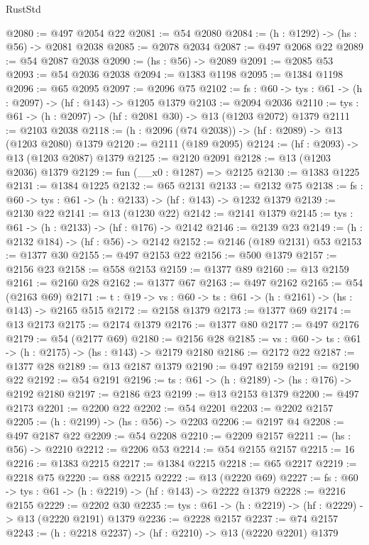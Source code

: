 \begin{lexlean}{RustStd}
\begin{coremodule}
{\begin{coremodule}
{{{{{{{{{{{{@2080 := @497 @2054 @22
@2081 := @54 @2080
@2084 := (h : @1292) -> (hs : @56) -> @2081 @2038
@2085 := @2078 @2034
@2087 := @497 @2068 @22
@2089 := @54 @2087 @2038
@2090 := (hs : @56) -> @2089
@2091 := @2085 @53
@2093 := @54 @2036 @2038
@2094 := @1383 @1198
@2095 := @1384 @1198
@2096 := @65 @2095
@2097 := @2096 @75
@2102 := {fs : @60} -> {tys : @61} -> (h : @2097) -> (hf : @143) -> @1205 @1379
@2103 := @2094 @2036
@2110 := {tys : @61} -> (h : @2097) -> (hf : @2081 @30) -> @13 (@1203 @2072) @1379
@2111 := @2103 @2038
@2118 := (h : @2096 (@74 @2038)) -> (hf : @2089) -> @13 (@1203 @2080) @1379
@2120 := @2111 (@189 @2095)
@2124 := (hf : @2093) -> @13 (@1203 @2087) @1379
@2125 := @2120 @2091
@2128 := @13 (@1203 @2036) @1379
@2129 := fun (__x0 : @1287) => @2125
@2130 := @1383 @1225
@2131 := @1384 @1225
@2132 := @65 @2131
@2133 := @2132 @75
@2138 := {fs : @60} -> {tys : @61} -> (h : @2133) -> (hf : @143) -> @1232 @1379
@2139 := @2130 @22
@2141 := @13 (@1230 @22)
@2142 := @2141 @1379
@2145 := {tys : @61} -> (h : @2133) -> (hf : @176) -> @2142
@2146 := @2139 @23
@2149 := (h : @2132 @184) -> (hf : @56) -> @2142
@2152 := @2146 (@189 @2131) @53
@2153 := @1377 @30
@2155 := @497 @2153 @22
@2156 := @500 @1379
@2157 := @2156 @23
@2158 := @558 @2153
@2159 := @1377 @89
@2160 := @13 @2159
@2161 := @2160 @28
@2162 := @1377 @67
@2163 := @497 @2162
@2165 := @54 (@2163 @69)
@2171 := {t : @19} -> {vs : @60} -> {ts : @61} -> (h : @2161) -> (hs : @143) -> @2165 @515
@2172 := @2158 @1379
@2173 := @1377 @69
@2174 := @13 @2173
@2175 := @2174 @1379
@2176 := @1377 @80
@2177 := @497 @2176
@2179 := @54 (@2177 @69)
@2180 := @2156 @28
@2185 := {vs : @60} -> {ts : @61} -> (h : @2175) -> (hs : @143) -> @2179 @2180
@2186 := @2172 @22
@2187 := @1377 @28
@2189 := @13 @2187 @1379
@2190 := @497 @2159
@2191 := @2190 @22
@2192 := @54 @2191
@2196 := {ts : @61} -> (h : @2189) -> (hs : @176) -> @2192 @2180
@2197 := @2186 @23
@2199 := @13 @2153 @1379
@2200 := @497 @2173
@2201 := @2200 @22
@2202 := @54 @2201
@2203 := @2202 @2157
@2205 := (h : @2199) -> (hs : @56) -> @2203
@2206 := @2197 @4
@2208 := @497 @2187 @22
@2209 := @54 @2208
@2210 := @2209 @2157
@2211 := (hs : @56) -> @2210
@2212 := @2206 @53
@2214 := @54 @2155 @2157
@2215 := 16
@2216 := @1383 @2215
@2217 := @1384 @2215
@2218 := @65 @2217
@2219 := @2218 @75
@2220 := @88 @2215
@2222 := @13 (@2220 @69)
@2227 := {fs : @60} -> {tys : @61} -> (h : @2219) -> (hf : @143) -> @2222 @1379
@2228 := @2216 @2155
@2229 := @2202 @30
@2235 := {tys : @61} -> (h : @2219) -> (hf : @2229) -> @13 (@2220 @2191) @1379
@2236 := @2228 @2157
@2237 := @74 @2157
@2243 := (h : @2218 @2237) -> (hf : @2210) -> @13 (@2220 @2201) @1379
}}}}}}}}}}}}
\end{coremodule}}
\end{coremodule}
\end{lexlean}
